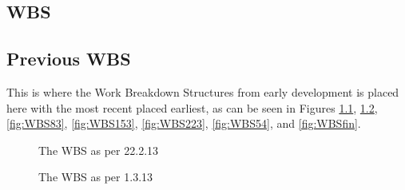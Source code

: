 \begin{appendices}
\chapter{WBS}

\section{Previous WBS}
This is where the Work Breakdown Structures from early development is placed here with the most recent placed earliest, as can be seen in Figures \ref{fig:WBS222}, \ref{fig:WBS13}, \ref{fig:WBS83}, \ref{fig:WBS153}, \ref{fig:WBS223}, \ref{fig:WBS54}, and \ref{fig:WBSfin}.

\begin{figure}[p]
\setlength\fboxsep{0pt}
\setlength\fboxrule{1pt}\noindent{}
\caption{The WBS as per 22.2.13 }
\label{fig:WBS222}
\end{figure}

\begin{figure}[p]
\setlength\fboxsep{0pt}
\setlength\fboxrule{1pt}\noindent{}
\caption{The WBS as per 1.3.13}
\label{fig:WBS13}
\end{figure}



\end{appendices}
